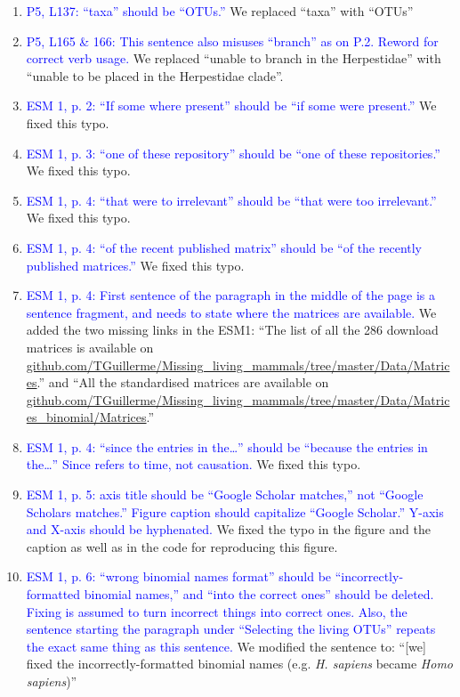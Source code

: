 \documentclass[12pt,letterpaper]{article}
\begin{document}
\begin{enumerate}
\item{\textcolor{blue}{P5, L137: ``taxa'' should be ``OTUs.''}}
We replaced ``taxa'' with ``OTUs''

\item{\textcolor{blue}{P5, L165 \& 166: This sentence also misuses ``branch'' as on P.2. Reword for correct verb usage.}}
We replaced ``unable to branch in the Herpestidae'' with ``unable to be placed in the Herpestidae clade''.

\item{\textcolor{blue}{ESM 1, p. 2: ``If some where present'' should be ``if some were present.''}}
We fixed this typo.

\item{\textcolor{blue}{ESM 1, p. 3: ``one of these repository'' should be ``one of these repositories.''}}
We fixed this typo.

\item{\textcolor{blue}{ESM 1, p. 4: ``that were to irrelevant'' should be ``that were too irrelevant.''}}
We fixed this typo.

\item{\textcolor{blue}{ESM 1, p. 4: ``of the recent published matrix'' should be ``of the recently published matrices.''}}
We fixed this typo.

\item{\textcolor{blue}{ESM 1, p. 4: First sentence of the paragraph in the middle of the page is a sentence fragment, and needs to state where the matrices are available.}}
We added the two missing links in the ESM1: ``The list of all the 286 download matrices is available on \url{github.com/TGuillerme/Missing_living_mammals/tree/master/Data/Matrices}.'' and ``All the standardised matrices are available on \url{github.com/TGuillerme/Missing_living_mammals/tree/master/Data/Matrices_binomial/Matrices}.''

\item{\textcolor{blue}{ESM 1, p. 4: ``since the entries in the…'' should be ``because the entries in the…'' Since refers to time, not causation.}}
We fixed this typo.

\item{\textcolor{blue}{ESM 1, p. 5: axis title should be ``Google Scholar matches,'' not ``Google Scholars matches.'' Figure caption should capitalize ``Google Scholar.'' Y-axis and X-axis should be hyphenated.}}
We fixed the typo in the figure and the caption as well as in the code for reproducing this figure.

\item{\textcolor{blue}{ESM 1, p. 6: ``wrong binomial names format'' should be ``incorrectly-formatted binomial names,'' and ``into the correct ones'' should be deleted.
Fixing is assumed to turn incorrect things into correct ones.
Also, the sentence starting the paragraph under ``Selecting the living OTUs'' repeats the exact same thing as this sentence.}}
We modified the sentence to: ``[we] fixed the incorrectly-formatted binomial names (e.g. \textit{H. sapiens} became \textit{Homo sapiens})'' %


\end{enumerate}
\end{document}

